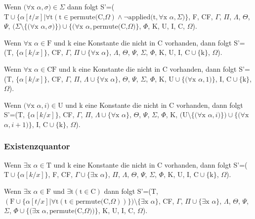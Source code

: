 Wenn $(\forall\textrm{x}$ $\alpha, \sigma)\in\Sigma$ dann folgt S'=($\textrm{T}\cup\lbrace\alpha[t/x]|\forall\textrm{t}(\textrm{t}\in\textrm{permute(C,}\Omega)\wedge\neg\textrm{applied(t},\forall\textrm{x}$ $\alpha, \Sigma)\rbrace$, F, CF, $\Gamma$, $\Pi$, $\Lambda$, $\Theta$, $\Psi$, $(\Sigma\setminus\lbrace(\forall\textrm{x}$ $\alpha, \sigma)\rbrace)\cup\lbrace(\forall\textrm{x}$ $\alpha,\textrm{permute(C,}\Omega)\rbrace$, $\Phi$, K, U, I, C, $\Omega$).

Wenn $\forall\textrm{x}$ $\alpha\in\textrm{F}$ und k eine Konstante die nicht in C vorhanden, dann folgt S'=(T, $\lbrace\alpha[k/x]\rbrace$, CF, $\Gamma$, $\Pi\cup\lbrace\forall\textrm{x}$ $\alpha\rbrace$, $\Lambda$, $\Theta$, $\Psi$, $\Sigma$, $\Phi$, K, U, I, $\textrm{C}\cup\lbrace\textrm{k}\rbrace$, $\Omega$).

Wenn $\forall\textrm{x}$ $\alpha\in\textrm{CF}$ und k eine Konstante die nicht in C vorhanden, dann folgt S'=(T, $\lbrace\alpha[k/x]\rbrace$, CF, $\Gamma$, $\Pi$, $\Lambda\cup\lbrace\forall\textrm{x}$ $\alpha\rbrace$, $\Theta$, $\Psi$, $\Sigma$, $\Phi$, K, $\textrm{U}\cup\lbrace(\forall\textrm{x}$ $\alpha, 1)\rbrace$, I, $\textrm{C}\cup\lbrace\textrm{k}\rbrace$, $\Omega$).

Wenn $(\forall\textrm{x}$ $\alpha, i)\in\textrm{U}$ und k eine Konstante die nicht in C vorhanden, dann folgt S'=(T, $\lbrace\alpha[k/x]\rbrace$, CF, $\Gamma$, $\Pi$, $\Lambda\cup\lbrace\forall\textrm{x}$ $\alpha\rbrace$, $\Theta$, $\Psi$, $\Sigma$, $\Phi$, K, $(\textrm{U}\setminus\lbrace(\forall\textrm{x}$ $\alpha, i)\rbrace)\cup\lbrace(\forall\textrm{x}$ $\alpha, i+1)\rbrace$, I, $\textrm{C}\cup\lbrace\textrm{k}\rbrace$, $\Omega$).

\subsubsection{Existenzquantor}
Wenn $\exists\textrm{x}$ $\alpha\in\textrm{T}$ und k eine Konstante die nicht in C vorhanden, dann folgt S'=($\textrm{T}\cup\lbrace\alpha[k/x]\rbrace$, F, CF, $\Gamma\cup\lbrace\exists\textrm{x}$ $\alpha\rbrace$, $\Pi$, $\Lambda$, $\Theta$, $\Psi$, $\Sigma$, $\Phi$, K, U, I, $\textrm{C}\cup\lbrace\textrm{k}\rbrace$, $\Omega$).

Wenn $\exists\textrm{x}$ $\alpha\in\textrm{F}$ und $\exists\textrm{t}(\textrm{t}\in\textrm{C})$ dann folgt S'=(T, $(\textrm{F}\cup\lbrace\alpha[t/x]|\forall\textrm{t}(\textrm{t}\in\textrm{permute(C,}\Omega))\rbrace)\setminus\lbrace\exists\textrm{x}$ $\alpha\rbrace$, CF, $\Gamma$, $\Pi\cup\lbrace\exists\textrm{x}$ $\alpha\rbrace$, $\Lambda$, $\Theta$, $\Psi$, $\Sigma$, $\Phi\cup\lbrace(\exists\textrm{x}$ $\alpha,\textrm{permute(C,}\Omega))\rbrace$, K, U, I, C, $\Omega$).


